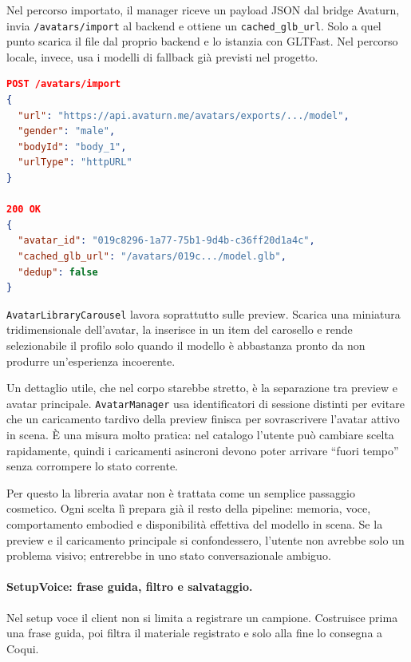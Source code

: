 Nel percorso importato, il manager riceve un payload JSON dal bridge Avaturn, invia \texttt{/avatars/import} al backend e ottiene un \texttt{cached\_glb\_url}. Solo a quel punto scarica il file dal proprio backend e lo istanzia con GLTFast. Nel percorso locale, invece, usa i modelli di fallback già previsti nel progetto.

\begin{lstlisting}[language=json,style=sfpayload,title={Import avatar backend-driven},caption={Payload minimo osservabile nel passaggio tra export Avaturn e catalogo del backend.}]
POST /avatars/import
{
  "url": "https://api.avaturn.me/avatars/exports/.../model",
  "gender": "male",
  "bodyId": "body_1",
  "urlType": "httpURL"
}

200 OK
{
  "avatar_id": "019c8296-1a77-75b1-9d4b-c36ff20d1a4c",
  "cached_glb_url": "/avatars/019c.../model.glb",
  "dedup": false
}
\end{lstlisting}

\texttt{AvatarLibraryCarousel} lavora soprattutto sulle preview. Scarica una miniatura tridimensionale dell'avatar, la inserisce in un item del carosello e rende selezionabile il profilo solo quando il modello è abbastanza pronto da non produrre un'esperienza incoerente.

Un dettaglio utile, che nel corpo starebbe stretto, è la separazione tra preview e avatar principale. \texttt{AvatarManager} usa identificatori di sessione distinti per evitare che un caricamento tardivo della preview finisca per sovrascrivere l'avatar attivo in scena. È una misura molto pratica: nel catalogo l'utente può cambiare scelta rapidamente, quindi i caricamenti asincroni devono poter arrivare ``fuori tempo'' senza corrompere lo stato corrente.

Per questo la libreria avatar non è trattata come un semplice passaggio cosmetico. Ogni scelta lì prepara già il resto della pipeline: memoria, voce, comportamento embodied e disponibilità effettiva del modello in scena. Se la preview e il caricamento principale si confondessero, l'utente non avrebbe solo un problema visivo; entrerebbe in uno stato conversazionale ambiguo.

\paragraph{SetupVoice: frase guida, filtro e salvataggio.}
Nel setup voce il client non si limita a registrare un campione. Costruisce prima una frase guida, poi filtra il materiale registrato e solo alla fine lo consegna a Coqui.

